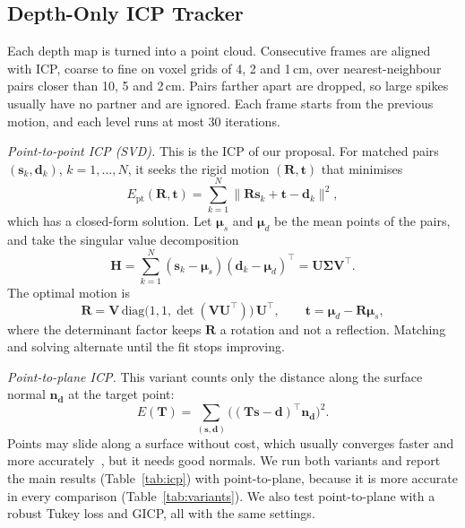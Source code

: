 \documentclass[conference]{IEEEtran}
\begin{document}
\subsection{Depth-Only ICP Tracker}

Each depth map is turned into a point cloud. Consecutive frames are aligned
with ICP, coarse to fine on voxel grids of 4, 2 and 1\,cm, over
nearest-neighbour pairs closer than 10, 5 and 2\,cm. Pairs farther apart are
dropped, so large spikes usually have no partner and are ignored. Each frame
starts from the previous motion, and each level runs at most 30 iterations.

\emph{Point-to-point ICP (SVD).} This is the ICP of our proposal. For matched
pairs $(\mathbf{s}_k,\mathbf{d}_k)$, $k=1,\dots,N$, it seeks the rigid motion
$(\mathbf{R},\mathbf{t})$ that minimises
\begin{equation}
E_{\mathrm{pt}}(\mathbf{R},\mathbf{t}) = \sum_{k=1}^{N}
\bigl\lVert \mathbf{R}\mathbf{s}_k+\mathbf{t}-\mathbf{d}_k \bigr\rVert^{2},
\label{eq:p2p}
\end{equation}
which has a closed-form solution. Let $\boldsymbol{\mu}_s$ and
$\boldsymbol{\mu}_d$ be the mean points of the pairs, and take the singular
value decomposition
\begin{equation}
\mathbf{H}=\sum_{k=1}^{N}(\mathbf{s}_k-\boldsymbol{\mu}_s)
(\mathbf{d}_k-\boldsymbol{\mu}_d)^{\top}
=\mathbf{U}\boldsymbol{\Sigma}\mathbf{V}^{\top}.
\label{eq:svd}
\end{equation}
The optimal motion is
\begin{equation}
\mathbf{R}=\mathbf{V}\,\mathrm{diag}\bigl(1,1,\det(\mathbf{V}\mathbf{U}^{\top})\bigr)\,
\mathbf{U}^{\top},\qquad
\mathbf{t}=\boldsymbol{\mu}_d-\mathbf{R}\boldsymbol{\mu}_s,
\label{eq:rt}
\end{equation}
where the determinant factor keeps $\mathbf{R}$ a rotation and not a
reflection. Matching and solving alternate until the fit stops improving.

\emph{Point-to-plane ICP.} This variant counts only the distance along the
surface normal $\mathbf{n}_\mathbf{d}$ at the target point:
\begin{equation}
E(\mathbf{T}) = \sum_{(\mathbf{s},\mathbf{d})}
\bigl((\mathbf{T}\mathbf{s}-\mathbf{d})^{\top}\mathbf{n}_\mathbf{d}\bigr)^2 .
\label{eq:icp}
\end{equation}
Points may slide along a surface without cost, which usually converges faster
and more accurately~\cite{rusinkiewicz2001efficient}, but it needs good
normals. We run both variants and report the main results
(Table~\ref{tab:icp}) with point-to-plane, because it is more accurate in
every comparison (Table~\ref{tab:variants}). We also test point-to-plane with
a robust Tukey loss and GICP, all with the same settings.
\end{document}
